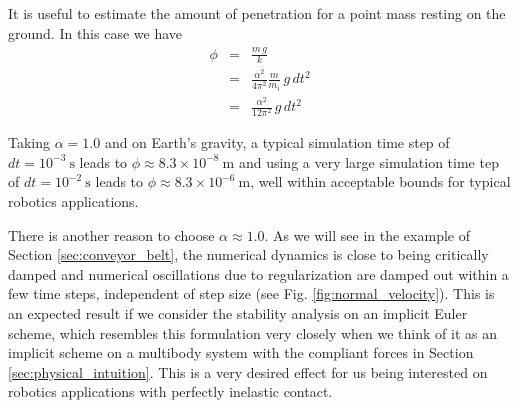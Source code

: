 It is useful to estimate the amount of penetration for a point mass resting on
the ground. In this case we have
\begin{eqnarray}
	\phi &=& \frac{m\,g}{k} \nonumber\\
	&=& \frac{\alpha^2}{4\pi^2}\frac{m}{m_i}\,g\,dt^2\nonumber\\
	&=& \frac{\alpha^2}{12\pi^2}\,g\,dt^2
\end{eqnarray}

Taking $\alpha=1.0$ and on Earth's gravity, a typical simulation time step of
$dt=10^{-3}~\text{s}$ leads to $\phi\approx 8.3\times 10^{-8}~\text{m}$ and
using a very large simulation time tep of $dt=10^{-2}~\text{s}$ leads to
$\phi\approx 8.3\times 10^{-6}~\text{m}$, well within acceptable bounds for
typical robotics applications.

There is another reason to choose $\alpha\approx 1.0$. As we will see in the
example of Section \ref{sec:conveyor_belt}, the numerical dynamics is close to
being critically damped and numerical oscillations due to regularization are
damped out within a few time steps, independent of step size (see Fig.
\ref{fig:normal_velocity}). This is an expected result if we consider the
stability analysis on an implicit Euler scheme, which resembles this formulation
very closely when we think of it as an implicit scheme on a multibody system
with the compliant forces  in Section \ref{sec:physical_intuition}. This is a
very desired effect for us being interested on robotics applications with
perfectly inelastic contact.

